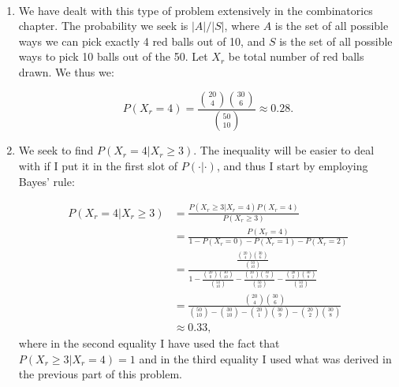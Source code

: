 \begin{problem}{10}$ $
\begin{enumerate}
\item We have dealt with this type of problem extensively in the combinatorics chapter.  The probability we seek is $|A|/|S|$, where $A$ is the set of all possible ways we can pick exactly 4 red balls out of 10, and $S$ is the set of all possible ways to pick 10 balls out of the 50.  Let $X_r$ be total number of red balls drawn.  We thus we:

\begin{equation}
P(X_r=4)=\frac{\binom{20}{4}\binom{30}{6}}{\binom{50}{10}} \approx 0.28.
\end{equation}

\item We seek to find $P(X_r=4|X_r \ge 3)$.  The inequality will be easier to deal with if I put it in the first slot of $P(\cdot | \cdot)$, and thus I start by employing Bayes' rule:

\begin{align*}
P(X_r=4|X_r \ge 3) &= \frac{P(X_r \ge 3|X_r=4)P(X_r=4)}{P(X_r \ge 3)} \\
& = \frac{P(X_r=4)}{1-P(X_r=0)-P(X_r=1)-P(X_r=2)} \\
&=\frac{\frac{\binom{20}{4}\binom{30}{6}}{\binom{50}{10}}}{1-\frac{\binom{20}{0}\binom{30}{10}}{\binom{50}{10}}-\frac{\binom{20}{1}\binom{30}{9}}{\binom{50}{10}}-\frac{\binom{20}{2}\binom{30}{8}}{\binom{50}{10}}} \\
& =\frac{\binom{20}{4}\binom{30}{6}}{\binom{50}{10}-\binom{30}{10}-\binom{20}{1}\binom{30}{9}-\binom{20}{2}\binom{30}{8}} \\
& \approx 0.33,
\end{align*}
where in the second equality I have used the fact that $P(X_r \ge 3|X_r=4)=1$ and in the third equality I used what was derived in the previous part of this problem.  

\end{enumerate}

\end{problem}

